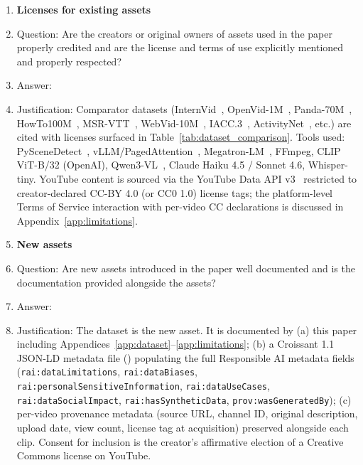 \begin{enumerate}
\item {\bf Licenses for existing assets}
    \item[] Question: Are the creators or original owners of assets used in the paper properly credited and are the license and terms of use explicitly mentioned and properly respected?
    \item[] Answer: \answerYes{}
    \item[] Justification: Comparator datasets (InternVid~\cite{wang2024internvid}, OpenVid-1M~\cite{nan2024openvid}, Panda-70M~\cite{chen2024panda70m}, HowTo100M~\cite{miech2019howto100m}, MSR-VTT~\cite{xu2016msrvtt}, WebVid-10M~\cite{bain2021frozen}, IACC.3~\cite{awad2022iacc3}, ActivityNet~\cite{heilbron2015activitynet}, etc.) are cited with licenses surfaced in Table~\ref{tab:dataset_comparison}. Tools used: PySceneDetect~\cite{castellano2014pyscenedetect}, vLLM/PagedAttention~\cite{kwon2023efficient}, Megatron-LM~\cite{shoeybi2019megatron, narayanan2021efficient}, FFmpeg, CLIP ViT-B/32 (OpenAI), Qwen3-VL~\cite{qwen3vxl}, Claude Haiku 4.5 / Sonnet 4.6, Whisper-tiny. YouTube content is sourced via the YouTube Data API v3~\cite{internet_archive_api} restricted to creator-declared CC-BY 4.0 (or CC0 1.0) license tags; the platform-level Terms of Service interaction with per-video CC declarations is discussed in Appendix~\ref{app:limitations}.

\item {\bf New assets}
    \item[] Question: Are new assets introduced in the paper well documented and is the documentation provided alongside the assets?
    \item[] Answer: \answerYes{}
    \item[] Justification: The dataset is the new asset. It is documented by (a) this paper including Appendices~\ref{app:dataset}--\ref{app:limitations}; (b) a Croissant 1.1 JSON-LD metadata file () populating the full Responsible AI metadata fields (\texttt{rai:dataLimitations}, \texttt{rai:dataBiases}, \texttt{rai:personalSensitiveInformation}, \texttt{rai:dataUseCases}, \texttt{rai:dataSocialImpact}, \texttt{rai:hasSyntheticData}, \texttt{prov:wasGeneratedBy}); (c) per-video provenance metadata (source URL, channel ID, original description, upload date, view count, license tag at acquisition) preserved alongside each clip. Consent for inclusion is the creator's affirmative election of a Creative Commons license on YouTube.


\end{enumerate}
